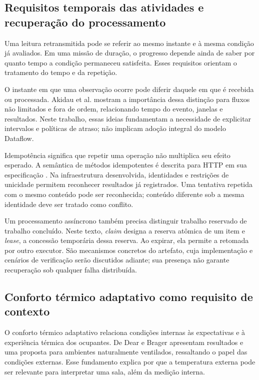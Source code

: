 \documentclass[tcc,capa]{texufpel}
\newif\ifemrevisao
\newcommand{\tintarevisao}{\ifemrevisao\color{correvisao}\fi}
\DeclareRobustCommand{\rev}[1]{{\tintarevisao #1}}
\begin{document}
\subsection{\rev{Requisitos temporais das atividades e recuperação do processamento}}
\rev{Uma leitura retransmitida pode se referir ao mesmo instante e à mesma condição já avaliados. Em uma missão de duração, o progresso depende ainda de saber por quanto tempo a condição permaneceu satisfeita. Esses requisitos orientam o tratamento do tempo e da repetição.}

O instante em que uma observação ocorre pode diferir daquele em que é recebida ou processada. Akidau et al. \cite{akidau2015} mostram a importância dessa distinção para fluxos não limitados e fora de ordem, relacionando tempo do evento, janelas e resultados. Neste trabalho, essas ideias fundamentam a necessidade de explicitar intervalos e políticas de atraso; não implicam adoção integral do modelo Dataflow.

Idempotência significa que repetir uma operação não multiplica seu efeito esperado. A semântica de métodos idempotentes é descrita para HTTP em sua especificação \cite{http2022}. \rev{Na infraestrutura desenvolvida, identidades e restrições de unicidade permitem reconhecer resultados já registrados.} Uma tentativa repetida com o mesmo conteúdo pode ser reconhecida; conteúdo diferente sob a mesma identidade deve ser tratado como conflito.

Um processamento assíncrono também precisa distinguir trabalho reservado de trabalho concluído. Neste texto, \emph{claim} designa a reserva atômica de um item e \emph{lease}, a concessão temporária dessa reserva. Ao expirar, ela permite a retomada por outro executor. São mecanismos concretos do artefato, cuja implementação e cenários de verificação serão discutidos adiante; sua presença não garante recuperação sob qualquer falha distribuída.

\subsection{\rev{Conforto térmico adaptativo como requisito de contexto}}
O conforto térmico adaptativo relaciona condições internas às expectativas e à experiência térmica dos ocupantes. De Dear e Brager \cite{deDear2002} apresentam resultados e uma proposta para ambientes naturalmente ventilados, ressaltando o papel das condições externas. Esse fundamento explica por que a temperatura externa pode ser relevante para interpretar uma sala, além da medição interna.
\end{document}
